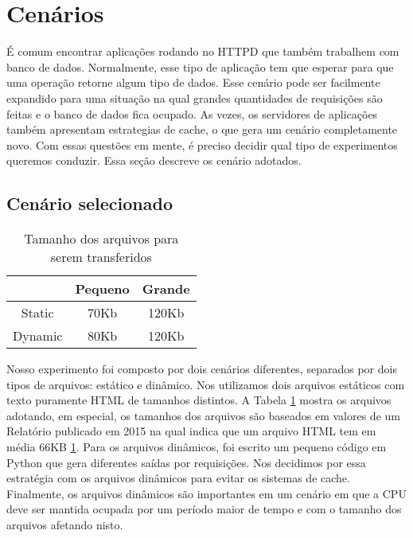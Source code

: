 \section{Cenários}

É comum encontrar aplicações rodando no HTTPD que também trabalhem com banco de
dados. Normalmente, esse tipo de aplicação tem que esperar para que uma
operação retorne algum tipo de dados. Esse cenário pode ser facilmente
expandido para uma situação na qual grandes quantidades de requisições são
feitas e o banco de dados fica ocupado. As vezes, os servidores de aplicações
também apresentam estrategias de cache, o que gera um cenário completamente
novo. Com essas questões em mente, é preciso decidir qual tipo de experimentos
queremos conduzir. Essa seção descreve os cenário adotados.

\subsection{Cenário selecionado}
\label{sec:scenarios}

\begin{table}[!h]
  \centering
  \begin{tabular}{|c|c|c|}
    \hline
    & \textbf{Pequeno} & \textbf{Grande}\\
    \hline
    Static & 70Kb & 120Kb\\
    \hline
    Dynamic & 80Kb & 120Kb \\
    \hline
  \end{tabular}
  \caption{Tamanho dos arquivos para serem transferidos}
  \label{tab:file_size}
\end{table}

Nosso experimento foi composto por dois cenários diferentes, separados por dois
tipos de arquivos: estático e dinâmico. Nos utilizamos dois arquivos
estáticos com texto puramente HTML de tamanhos distintos. A Tabela
\ref{tab:file_size} mostra os arquivos adotando, em especial, os tamanhos dos
arquivos são baseados em valores de um Relatório publicado em 2015 na qual
indica que um arquivo HTML tem em média 66KB \ref{tab:file_size}. Para os
arquivos dinâmicos, foi escrito um pequeno código em Python que gera diferentes
saídas por requisições. Nos decidimos por essa estratégia com os arquivos
dinâmicos para evitar os sistemas de cache. Finalmente, os arquivos dinâmicos
são importantes em um cenário em que a CPU deve ser mantida ocupada por um
período maior de tempo e com o tamanho dos arquivos afetando nisto.

